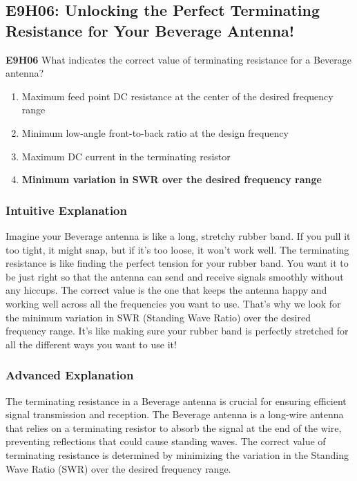 \subsection{E9H06: Unlocking the Perfect Terminating Resistance for Your Beverage Antenna!}

\begin{tcolorbox}[colback=gray!10!white,colframe=black!75!black,title=Question E9H06]
\textbf{E9H06} What indicates the correct value of terminating resistance for a Beverage antenna?
\begin{enumerate}[label=\Alph*.]
    \item Maximum feed point DC resistance at the center of the desired frequency range
    \item Minimum low-angle front-to-back ratio at the design frequency
    \item Maximum DC current in the terminating resistor
    \item \textbf{Minimum variation in SWR over the desired frequency range}
\end{enumerate}
\end{tcolorbox}

\subsubsection*{Intuitive Explanation}
Imagine your Beverage antenna is like a long, stretchy rubber band. If you pull it too tight, it might snap, but if it's too loose, it won't work well. The terminating resistance is like finding the perfect tension for your rubber band. You want it to be just right so that the antenna can send and receive signals smoothly without any hiccups. The correct value is the one that keeps the antenna happy and working well across all the frequencies you want to use. That's why we look for the minimum variation in SWR (Standing Wave Ratio) over the desired frequency range. It's like making sure your rubber band is perfectly stretched for all the different ways you want to use it!

\subsubsection*{Advanced Explanation}
The terminating resistance in a Beverage antenna is crucial for ensuring efficient signal transmission and reception. The Beverage antenna is a long-wire antenna that relies on a terminating resistor to absorb the signal at the end of the wire, preventing reflections that could cause standing waves. The correct value of terminating resistance is determined by minimizing the variation in the Standing Wave Ratio (SWR) over the desired frequency range. 

